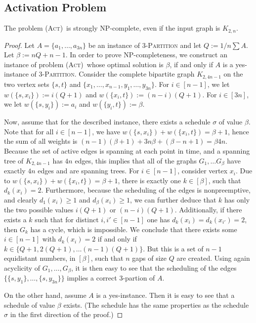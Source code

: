 \documentclass[runningheads]{llncs}
\numberwithin{equation}{section}
\newcommand{\set}[1]{\{ #1 \}}
\newcommand{\fromto}[2]{\set{#1, \ldots, #2}}
\newcommand{\act}{\textsc{(Act)}}
\begin{document}
\subsection{Activation Problem}

\begin{theorem}
\label{thm:hardness_complete_bipartite}
The problem \act\ is strongly NP-complete, even if the input graph is $K_{2,n}$.
\end{theorem}
\begin{proof}
Let $A = \fromto{a_1}{a_{3n}}$ be an instance of \textsc{3-Partition} and let $Q := 1/n \sum A$. Let $\beta := nQ + n - 1$. In order to prove NP-completeness, we construct an instance of problem \act\ whose optimal solution is $\beta$, if and only if $A$ is a yes-instance of \textsc{3-Partition}. Consider the  complete bipartite graph $K_{2,4n-1}$ on the two vertex sets $\set{s, t}$ and $\set{x_1, \ldots, x_{n-1}, y_1, \ldots, y_{3n}}$. For $i \in [n-1]$, we let $w(\set{s,x_i}) := i(Q + 1)$ and $w(\set{x_i,t}) := (n - i)(Q + 1)$. For $i \in [3n]$, we let $w(\set{s,y_i}) := a_i$ and $w(\set{y_i,t}) := \beta$. 

Now, assume that for the described instance, there exists a schedule $\sigma$ of value $\beta$. Note that for all $i \in [n-1]$, we have $w(\set{s,x_i}) + w(\set{x_i,t}) = \beta + 1$, hence the sum of all weights is $(n-1)(\beta + 1) + 3n\beta + (\beta - n + 1) = \beta 4n$. Because the set of active edges is spanning at each point in time, and a spanning tree of $K_{2, 4n-1}$ has $4n$ edges, this implies that all of the graphs $G_1, \dots G_\beta$ have exactly $4n$ edges and are spanning trees. For $i \in [n-1
]$, consider vertex $x_i$.  Due to $w(\set{s,x_i}) + w(\set{x_i,t}) = \beta + 1$, there is exactly one $k \in [\beta]$, such that $d_k(x_i) = 2$. Furthermore, because the scheduling of the edges is nonpreemptive, and clearly $d_1(x_i) \geq 1$ and $d_\beta(x_i) \geq 1$, we can further deduce that $k$ has only the two possible values $i(Q+1)$ or $(n-i)(Q+1)$. Additionally, if there exists a $k$ such that for distinct $i, i' \in [n-1]$ one has $d_k(x_i) = d_k(x_{i'}) = 2$, then $G_k$ has a cycle, which is impossible. We conclude that there exists some $i \in [n-1]$ with $d_k(x_i) = 2$ if and only if $k \in \set{Q+1, 2(Q+1), \dots (n-1)(Q+1)}$. But this is a set of $n-1$ equidistant numbers, in $[\beta]$, such that $n$ gaps of size $Q$ are created. Using again acyclicity of $G_1, \dots, G_\beta$, it is then easy to see that the scheduling of the edges $\fromto{\set{s,y_1}}{\set{s,y_{3n}}}$ implies a correct 3-partion of $A$.

On the other hand, assume $A$ is a yes-instance. Then it is easy to see that a schedule of value $\beta$ exists. (The schedule has the same properties as the schedule $\sigma$ in the first direction of the proof.)
\end{proof}
\end{document}
